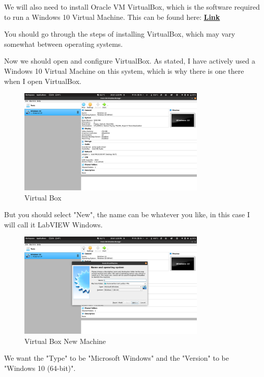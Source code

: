 \documentclass[a4paper,11pt]{report}
\let\oldhref\href %
\renewcommand{\href}[2]{\oldhref{#1}{\bfseries#2}}
\begin{document}
We will also need to install Oracle VM VirtualBox, which is the software required to run a Windows 10 Virtual Machine. This can be found here: \href{https://www.virtualbox.org/}{Link}

You should go through the steps of installing VirtualBox, which may vary somewhat between operating systems.

Now we should open and configure VirtualBox. As stated, I have actively used a Windows 10 Virtual Machine on this system, which is why there is one there when I open VirtualBox.

\begin{figure}[H]
\centering
\includegraphics[width=0.8\textwidth]{screenshots/virtualbox}
\caption{Virtual Box}
\end{figure}

But you should select "New", the name can be whatever you like, in this case I will call it LabVIEW Windows.

\begin{figure}[H]
\centering
\includegraphics[width=0.8\textwidth]{screenshots/virtualboxsetup}
\caption{Virtual Box New Machine}
\end{figure}

We want the "Type" to be "Microsoft Windows" and the "Version" to be "Windows 10 (64-bit)".
\end{document}
